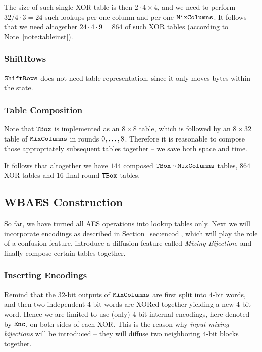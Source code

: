 	The size of such single XOR table is then $2\cdot 4\times 4$, and we need to perform $32/4\cdot 3=24$ such lookups per one column and per one $\texttt{MixColumns}$. It follows that we need altogether $24\cdot 4\cdot 9 = 864$ of such XOR tables (according to Note~\ref{note:tableinst}).

\subsubsection{ShiftRows}
	
	$\texttt{ShiftRows}$ does not need table representation, since it only moves bytes within the state.

\subsubsection{Table Composition}
	
	Note that $\texttt{TBox}$ is implemented as an $8\times 8$ table, which is followed by an $8\times 32$ table of $\texttt{MixColumns}$ in rounds $0 , \ldots , 8$. Therefore it is reasonable to compose those appropriately subsequent tables together -- we save both space and time.
	
	It follows that altogether we have $144$ composed $\texttt{TBox}\circ\texttt{MixColumns}$ tables, $864$ XOR tables and $16$ final round $\texttt{TBox}$ tables.



\subsection{WBAES Construction}
\label{sec:constrwbaes}

So far, we have turned all AES operations into lookup tables only. Next we will incorporate encodings as described in Section~\ref{sec:encod}, which will play the role of a confusion feature, introduce a diffusion feature called {\em Mixing Bijection}, and finally compose certain tables together.

\subsubsection{Inserting Encodings}
	
	Remind that the $32$-bit outputs of $\texttt{MixColumns}$ are first split into $4$-bit words, and then two independent $4$-bit words are XORed together yielding a new $4$-bit word. Hence we are limited to use (only) $4$-bit internal encodings, here denoted by $\texttt{Enc}$, on both sides of each XOR. This is the reason why {\em input mixing bijections} will be introduced -- they will diffuse two neighboring $4$-bit blocks together.

